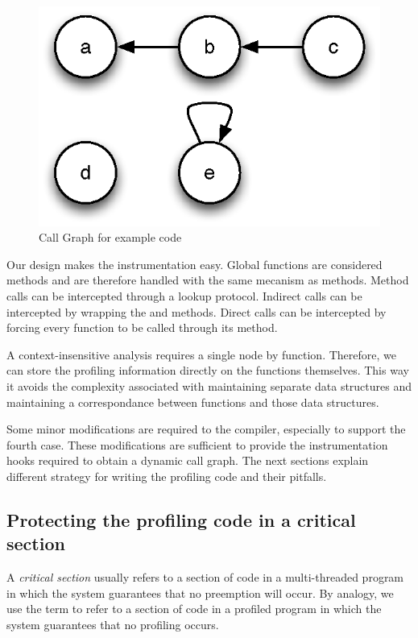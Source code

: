 \begin{figure}[htb]
\begin{center}
\includegraphics{figures/callgraph}
\caption{\label{fig:CallGraph} Call Graph for example code}
\end{center}
\end{figure}

Our design makes the instrumentation easy. Global functions are considered
methods and are therefore handled with the same mecanism as methods. Method
calls can be intercepted through a lookup protocol. Indirect calls can be
intercepted by wrapping the  and  methods. Direct calls can
be intercepted by forcing every function to be called through its 
method.

A context-insensitive analysis requires a single node by function. Therefore,
we can store the profiling information directly on the functions themselves.
This way it avoids the complexity associated with maintaining separate data
structures and maintaining a correspondance between functions and those data
structures.

Some minor modifications are required to the compiler, especially to support
the fourth case. These modifications are sufficient to provide the
instrumentation hooks required to obtain a dynamic call graph. The next
sections explain different strategy for writing the profiling code and their
pitfalls.

\subsection{Protecting the profiling code in a critical section} 

A \textit{critical section} usually refers to a section of code in a
multi-threaded program in which the system guarantees that no preemption will
occur. By analogy, we use the term to refer to a section of code in a profiled
program in which the system guarantees that no profiling occurs.

